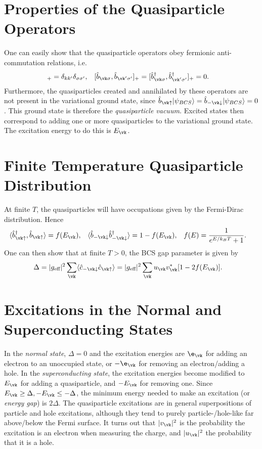 \documentclass[a4paper, 11pt, normalem]{report}
\begin{document}
\section{Properties of the Quasiparticle Operators}
One can easily show that the quasiparticle operators obey fermionic anti-commutation relations, i.e.
\begin{align}
    [\hat{b}_{\vk\sigma},\hat{b}_{\vk'\sigma'}^\dagger]_+ &= \delta_{kk'}\delta_{\sigma\sigma'}, & [\hat{b}_{\vk\sigma},\hat{b}_{\vk'\sigma'}]_+ &= [\hat{b}_{\vk\sigma}^\dagger,\hat{b}_{\vk'\sigma'}^\dagger]_+ = 0.
\end{align}
Furthermore, the quasiparticles created and annihilated by these operators are not present in the variational ground state, since $\hat{b}_{\vk\uparrow}|\psi_{BCS}\rangle=\hat{b}_{-\vk\downarrow}|\psi_{BCS}\rangle=0$.
This ground state is therefore the \emph{quasiparticle vacuum.}
Excited states then correspond to adding one or more quasiparticles to the variational ground state.
The excitation energy to do this is $E_{\vk}$.

\section{Finite Temperature Quasiparticle Distribution}
At finite $T$, the quasiparticles will have occupations given by the Fermi-Dirac distribution.
Hence
\begin{align}
    \langle\hat{b}_{\vk\uparrow}^\dagger,\hat{b}_{\vk\uparrow}\rangle &= f(E_{\vk}), & \langle\hat{b}_{-\vk\downarrow}\hat{b}_{-\vk\downarrow}^\dagger\rangle &= 1-f(E_{\vk}), & f(E) &= \frac{1}{e^{E/k_BT}+1}.
\end{align}
One can then show that at finite $T>0$, the BCS gap parameter is given by
\begin{align}
    \Delta &= |g_{\text{eff}}|^2\sum_{\vk} \langle\hat{c}_{-\vk\downarrow}\hat{c}_{\vk\uparrow}\rangle = |g_{\text{eff}}|^2\sum_{\vk}u_{\vk}v_{\vk}^*[1-2f(E_{\vk})].
\end{align}

\section{Excitations in the Normal and Superconducting States}
In the \emph{normal state}, $\Delta=0$ and the excitation energies are $\e_{\vk}$ for adding an electron to an unoccupied state, or $-\e_{\vk}$ for removing an electron/adding a hole.
In the \emph{superconducting state}, the excitation energies become modified to $E_{\vk}$ for adding a quasiparticle, and $-E_{\vk}$ for removing one.
Since $E_{\vk}\geq\Delta,-E_{\vk}\leq-\Delta$, the minimum energy needed to make an excitation (or \emph{energy gap}) is $2\Delta$.
The quasiparticle excitations are in general superpositions of particle and hole excitations, although they tend to purely particle-/hole-like far above/below the Fermi surface.
It turns out that $|v_{\vk}|^2$ is the probability the excitation is an electron when measuring the charge, and $|u_{\vk}|^2$ the probability that it is a hole.
\end{document}
